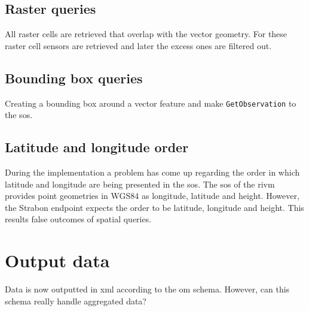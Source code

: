 \subsection{Raster queries}
All raster cells are retrieved that overlap with the vector geometry. For these raster cell sensors are retrieved and later the excess ones are filtered out. 

\subsection{Bounding box queries}
Creating a bounding box around a vector feature and make \texttt{GetObservation} to the \ac{sos}.  

\subsection{Latitude and longitude order}
During the implementation a problem has come up regarding the order in which latitude and longitude are being presented in the \ac{sos}. The \ac{sos} of the \ac{rivm} provides point geometries in WGS84 as longitude, latitude and height. However, the Strabon endpoint expects the order to be latitude, longitude and height. This results false outcomes of spatial queries.    

\section{Output data}
Data is now outputted in \ac{xml} according to the \ac{om} schema. However, can this schema really handle aggregated data?
